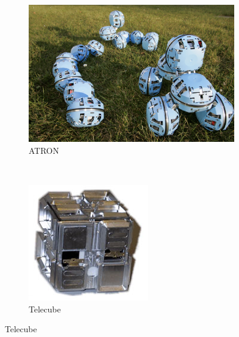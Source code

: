\begin{figure}[h]
		\centering
        \begin{subfigure}[b]{0.25\textwidth}
                \centering
                \includegraphics[width=\textwidth]{images/ATRON01.jpg}
                \caption{ATRON}
                \label{fig:ATRON}
        \end{subfigure}
        ~
        \begin{subfigure}[b]{0.18\textwidth}
                \centering
                \includegraphics[width=\textwidth]{images/Telecube.jpg}
                \caption{Telecube}

\end{subfigure}
\end{figure}
